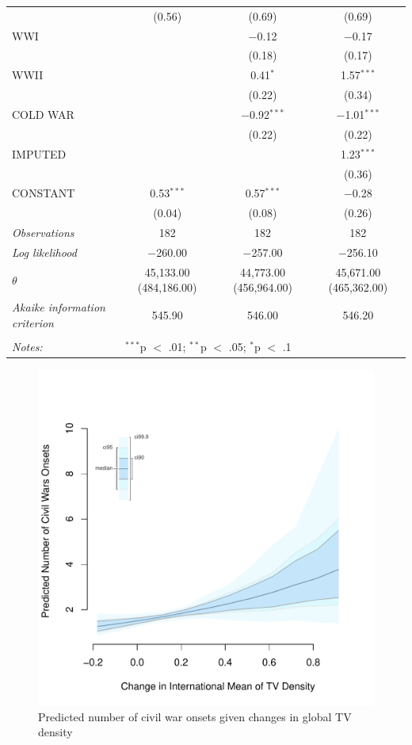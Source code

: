 \documentclass[12pt,article,oneside]{memoir}
\makeatletter
\def\maxwidth{\ifdim\Gin@nat@width>\linewidth\linewidth
\else\Gin@nat@width\fi}
\let\Oldincludegraphics\includegraphics
\renewcommand{\includegraphics}[1]{\Oldincludegraphics[width=\maxwidth]{#1}}
\makeatother
\begin{document}
\begin{table}[!htbp]
\begin{tabular}{@{\extracolsep{5pt}}lccc}
  & (0.56) & (0.69) & (0.69) \\ 
  WWI &  & $-$0.12 & $-$0.17 \\ 
  &  & (0.18) & (0.17) \\ 
  WWII &  & 0.41$^{*}$ & 1.57$^{***}$ \\ 
  &  & (0.22) & (0.34) \\ 
  COLD WAR &  & $-$0.92$^{***}$ & $-$1.01$^{***}$ \\ 
  &  & (0.22) & (0.22) \\ 
  IMPUTED &  &  & 1.23$^{***}$ \\ 
  &  &  & (0.36) \\ 
  CONSTANT & 0.53$^{***}$ & 0.57$^{***}$ & $-$0.28 \\ 
  & (0.04) & (0.08) & (0.26) \\ 
 \textit{Observations} & 182 & 182 & 182 \\ 
\textit{Log likelihood} & $-$260.00 & $-$257.00 & $-$256.10 \\ 
$\theta$ & 45,133.00  (484,186.00) & 44,773.00  (456,964.00) & 45,671.00  (465,362.00) \\ 
\textit{Akaike information criterion} & 545.90 & 546.00 & 546.20 \\ 
\hline \\[-1.8ex] 
\textit{Notes:} & \multicolumn{3}{l}{$^{***}$p $<$ .01; $^{**}$p $<$ .05; $^{*}$p $<$ .1} \\ 
\end{tabular} 
\end{table}

\clearpage

\begin{figure} 
\includegraphics{figure/dtv_effect.pdf} 
\caption{Predicted number of civil war onsets given changes in global TV density} 
\label{myFigur} 
\end{figure}
\end{document}
